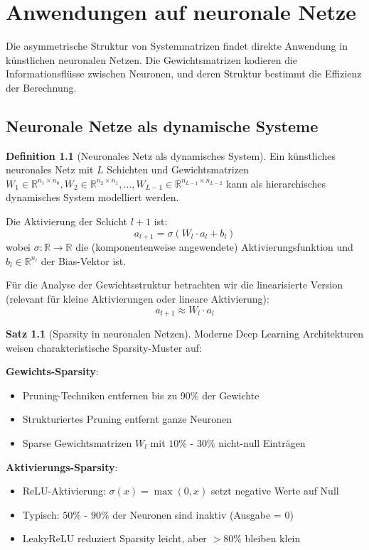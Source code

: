 ﻿\documentclass[a4paper,12pt]{report}
\theoremstyle{definition}
\newtheorem{definition}{Definition}
\newtheorem{satz}{Satz}
\begin{document}
	\chapter{Anwendungen auf neuronale Netze}
	
	Die asymmetrische Struktur von Systemmatrizen findet direkte Anwendung in künstlichen neuronalen Netzen. Die Gewichtsmatrizen kodieren die Informationsflüsse zwischen Neuronen, und deren Struktur bestimmt die Effizienz der Berechnung.
	
	\section{Neuronale Netze als dynamische Systeme}
	
	\begin{definition}[Neuronales Netz als dynamisches System]
		Ein künstliches neuronales Netz mit $L$ Schichten und Gewichtsmatrizen $W_1 \in \mathbb{R}^{n_1 \times n_0}, W_2 \in \mathbb{R}^{n_2 \times n_1}, \ldots, W_{L-1} \in \mathbb{R}^{n_{L-1} \times n_{L-2}}$ kann als hierarchisches dynamisches System modelliert werden.
		
		Die Aktivierung der Schicht $l+1$ ist:
		\[
		a_{l+1} = \sigma(W_l \cdot a_l + b_l)
		\]
		wobei $\sigma : \mathbb{R} \to \mathbb{R}$ die (komponentenweise angewendete) Aktivierungsfunktion und $b_l \in \mathbb{R}^{n_l}$ der Bias-Vektor ist.
		
		Für die Analyse der Gewichtsstruktur betrachten wir die linearisierte Version (relevant für kleine Aktivierungen oder lineare Aktivierung):
		\[
		a_{l+1} \approx W_l \cdot a_l
		\]
	\end{definition}
	
	\begin{satz}[Sparsity in neuronalen Netzen]
		Moderne Deep Learning Architekturen weisen charakteristische Sparsity-Muster auf:
		
		\textbf{Gewichts-Sparsity}:
		\begin{itemize}
			\item Pruning-Techniken entfernen bis zu 90\% der Gewichte
			\item Strukturiertes Pruning entfernt ganze Neuronen
			\item Sparse Gewichtsmatrizen $W_l$ mit $10\%$ - $30\%$ nicht-null Einträgen
		\end{itemize}
		
		\textbf{Aktivierungs-Sparsity}:
		\begin{itemize}
			\item ReLU-Aktivierung: $\sigma(x) = \max(0, x)$ setzt negative Werte auf Null
			\item Typisch: $50\%$ - $90\%$ der Neuronen sind inaktiv (Ausgabe = 0)
			\item LeakyReLU reduziert Sparsity leicht, aber $>80\%$ bleiben klein
		\end{itemize}
	\end{satz}
	
\end{document}

